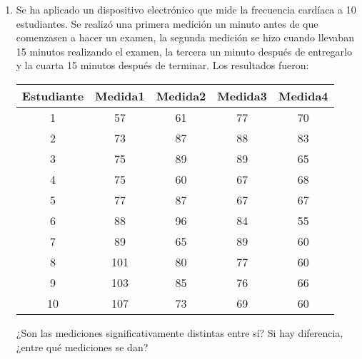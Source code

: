\begin{enumerate}
\item Se ha aplicado un dispositivo electrónico que mide la frecuencia cardíaca a 10 estudiantes. Se realizó una primera medición un minuto antes de que comenzasen a hacer un examen, la segunda medición se hizo cuando llevaban 15 minutos realizando el examen, la tercera un minuto después de entregarlo y la cuarta 15 minutos después de terminar. Los resultados fueron:

    \begin{center}

\begin{tabular}{|l|l|l|l|l|}
\hline
\multicolumn{1}{|c|}{Estudiante} & \multicolumn{1}{c|}{Medida1} & \multicolumn{1}{c|}{Medida2} & \multicolumn{1}{c|}{Medida3} & \multicolumn{1}{c|}{Medida4} \\
\hline
\multicolumn{1}{|c|}{1} & \multicolumn{1}{c|}{57} & \multicolumn{1}{c|}{61} & \multicolumn{1}{c|}{77} & \multicolumn{1}{c|}{70} \\
\hline
\multicolumn{1}{|c|}{2} & \multicolumn{1}{c|}{73} & \multicolumn{1}{c|}{87} & \multicolumn{1}{c|}{88} & \multicolumn{1}{c|}{83} \\
\hline
\multicolumn{1}{|c|}{3} & \multicolumn{1}{c|}{75} & \multicolumn{1}{c|}{89} & \multicolumn{1}{c|}{89} & \multicolumn{1}{c|}{65} \\
\hline
\multicolumn{1}{|c|}{4} & \multicolumn{1}{c|}{75} & \multicolumn{1}{c|}{60} & \multicolumn{1}{c|}{67} & \multicolumn{1}{c|}{68} \\
\hline
\multicolumn{1}{|c|}{5} & \multicolumn{1}{c|}{77} & \multicolumn{1}{c|}{87} & \multicolumn{1}{c|}{67} & \multicolumn{1}{c|}{67} \\
\hline
\multicolumn{1}{|c|}{6} & \multicolumn{1}{c|}{88} & \multicolumn{1}{c|}{96} & \multicolumn{1}{c|}{84} & \multicolumn{1}{c|}{55} \\
\hline
\multicolumn{1}{|c|}{7} & \multicolumn{1}{c|}{89} & \multicolumn{1}{c|}{65} & \multicolumn{1}{c|}{89} & \multicolumn{1}{c|}{60} \\
\hline
\multicolumn{1}{|c|}{8} & \multicolumn{1}{c|}{101} & \multicolumn{1}{c|}{80} & \multicolumn{1}{c|}{77} & \multicolumn{1}{c|}{60} \\
\hline
\multicolumn{1}{|c|}{9} & \multicolumn{1}{c|}{103} & \multicolumn{1}{c|}{85} & \multicolumn{1}{c|}{76} & \multicolumn{1}{c|}{66} \\
\hline
\multicolumn{1}{|c|}{10} & \multicolumn{1}{c|}{107} & \multicolumn{1}{c|}{73} & \multicolumn{1}{c|}{69} & \multicolumn{1}{c|}{60} \\
\hline
\end{tabular}

\end{center}

¿Son las mediciones significativamente distintas entre sí? Si hay diferencia, ¿entre qué mediciones se dan?

\end{enumerate}

